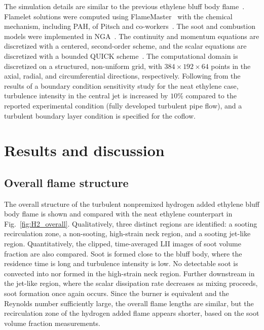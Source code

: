 \documentclass[review,3p,times]{elsarticle}
\begin{document}
The simulation details are similar to the previous ethylene bluff body flame~\cite{mueller13}.  Flamelet solutions were computed using FlameMaster~\cite{FlameMaster} with the chemical mechanism, including PAH, of Pitsch and co-workers~\cite{blanquart09b,narayanaswamy10}.  The soot and combustion models were implemented in NGA~\cite{desjardins08}.  The continuity and momentum equations are discretized with a centered, second-order scheme, and the scalar equations are discretized with a bounded QUICK scheme~\cite{herrmann06}.  The computational domain is discretized on a structured, non-uniform grid, with $384 \times 192 \times 64$ points in the axial, radial, and circumferential directions, respectively.  Following from the results of a boundary condition sensitivity study for the neat ethylene case, turbulence intensity in the central jet is increased by $10$\% compared to the reported experimental condition (fully developed turbulent pipe flow), and a turbulent boundary layer condition is specified for the coflow.  


\section{Results and discussion}

\subsection{Overall flame structure}

The overall structure of the turbulent nonpremixed hydrogen added ethylene bluff body flame is shown and compared with the neat ethylene counterpart in Fig.~\ref{fig:H2_overall}.  Qualitatively, three distinct regions are identified: a sooting recirculation zone, a non-sooting, high-strain neck region, and a sooting jet-like region.  Quantitatively, the clipped, time-averaged LII images of soot volume fraction are also compared.  Soot is formed close to the bluff body, where the residence time is long and turbulence intensity is low.  No detectable soot is convected into nor formed in the high-strain neck region.   Further downstream in the jet-like region, where the scalar dissipation rate decreases as mixing proceeds, soot formation once again occurs.  Since the burner is equivalent and the Reynolds number sufficiently large, the overall flame lengths are similar, but the recirculation zone of the hydrogen added flame appears shorter, based on the soot volume fraction measurements.
\end{document}
